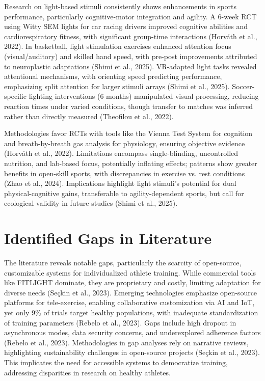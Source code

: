 Research on light-based stimuli consistently shows enhancements in sports performance, particularly cognitive-motor integration and agility. A 6-week RCT using Witty SEM lights for car racing drivers improved cognitive abilities and cardiorespiratory fitness, with significant group-time interactions (Horváth et al., 2022). In basketball, light stimulation exercises enhanced attention focus (visual/auditory) and skilled hand speed, with pre-post improvements attributed to neuroplastic adaptations (Shimi et al., 2025). VR-adapted light tasks revealed attentional mechanisms, with orienting speed predicting performance, emphasizing split attention for larger stimuli arrays (Shimi et al., 2025). Soccer-specific lighting interventions (6 months) manipulated visual processing, reducing reaction times under varied conditions, though transfer to matches was inferred rather than directly measured (Theofilou et al., 2022).

Methodologies favor RCTs with tools like the Vienna Test System for cognition and breath-by-breath gas analysis for physiology, ensuring objective evidence (Horváth et al., 2022). Limitations encompass single-blinding, uncontrolled nutrition, and lab-based focus, potentially inflating effects; patterns show greater benefits in open-skill sports, with discrepancies in exercise vs. rest conditions (Zhao et al., 2024). Implications highlight light stimuli's potential for dual physical-cognitive gains, transferable to agility-dependent sports, but call for ecological validity in future studies (Shimi et al., 2025).


\section{Identified Gaps in Literature}

The literature reveals notable gaps, particularly the scarcity of open-source, customizable systems for individualized athlete training. While commercial tools like FITLIGHT dominate, they are proprietary and costly, limiting adaptation for diverse needs (Seçkin et al., 2023). Emerging technologies emphasize open-source platforms for tele-exercise, enabling collaborative customization via AI and IoT, yet only 9\% of trials target healthy populations, with inadequate standardization of training parameters (Rebelo et al., 2023). Gaps include high dropout in asynchronous modes, data security concerns, and underexplored adherence factors (Rebelo et al., 2023). Methodologies in gap analyses rely on narrative reviews, highlighting sustainability challenges in open-source projects (Seçkin et al., 2023). This implicates the need for accessible systems to democratize training, addressing disparities in research on healthy athletes.